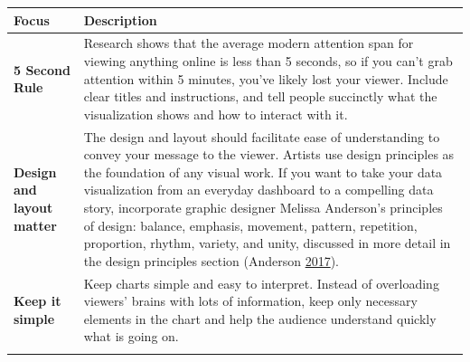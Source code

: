 \documentclass[]{book}
\begin{document}
\begin{longtable}[]{@{}ll@{}}
\toprule
\begin{minipage}[b]{0.19\columnwidth}\raggedright
\textbf{Focus}\strut
\end{minipage} & \begin{minipage}[b]{0.75\columnwidth}\raggedright
\textbf{Description}\strut
\end{minipage}\tabularnewline
\midrule
\endhead
\begin{minipage}[t]{0.19\columnwidth}\raggedright
\textbf{5 Second Rule}\strut
\end{minipage} & \begin{minipage}[t]{0.75\columnwidth}\raggedright
Research shows that the average modern attention span for viewing anything online is less than 5 seconds, so if you can't grab attention within 5 minutes, you've likely lost your viewer. Include clear titles and instructions, and tell people succinctly what the visualization shows and how to interact with it.\strut
\end{minipage}\tabularnewline
\begin{minipage}[t]{0.19\columnwidth}\raggedright
\textbf{Design and layout matter}\strut
\end{minipage} & \begin{minipage}[t]{0.75\columnwidth}\raggedright
The design and layout should facilitate ease of understanding to convey your message to the viewer. Artists use design principles as the foundation of any visual work. If you want to take your data visualization from an everyday dashboard to a compelling data story, incorporate graphic designer Melissa Anderson's principles of design: balance, emphasis, movement, pattern, repetition, proportion, rhythm, variety, and unity, discussed in more detail in the design principles section (Anderson \protect\hyperlink{ref-design_principles}{2017}).\strut
\end{minipage}\tabularnewline
\begin{minipage}[t]{0.19\columnwidth}\raggedright
\textbf{Keep it simple}\strut
\end{minipage} & \begin{minipage}[t]{0.75\columnwidth}\raggedright
Keep charts simple and easy to interpret. Instead of overloading viewers' brains with lots of information, keep only necessary elements in the chart and help the audience understand quickly what is going on.\strut
\end{minipage}\tabularnewline
\begin{minipage}[t]{0.19\columnwidth}\raggedright

\end{minipage}
\end{longtable}
\end{document}
